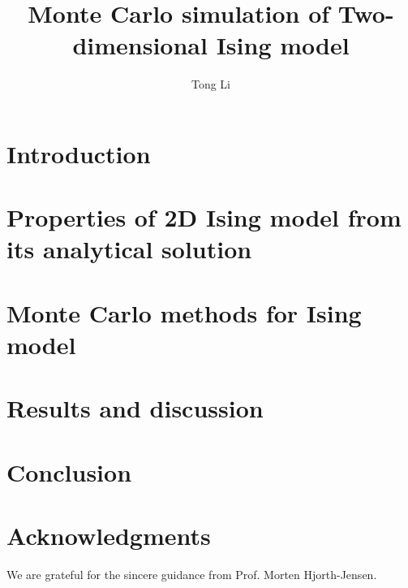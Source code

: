 \documentclass{article}
\title{Monte Carlo simulation of Two-dimensional Ising model}
\author[1]{Tong Li}
\affil[1]{Department of Physics and Astronomy, Michigan State University}
\date{}
\begin{document}
\maketitle
\begin{abstract}\label{abstract}

\end{abstract}

\section{Introduction}\label{intro} 

	
\section{Properties of 2D Ising model from its analytical solution}\label{theory}

	
\section{Monte Carlo methods for Ising model}\label{method}

	
\section{Results and discussion}\label{results}

	
\section{Conclusion}\label{conclude}

	
\section*{Acknowledgments}
We are grateful for the sincere guidance from Prof. Morten Hjorth-Jensen. 
	
\nocite{*} 


\end{document}
